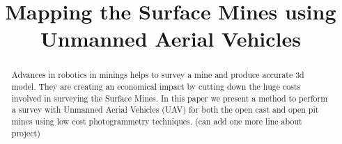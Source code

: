 \documentclass[conference]{IEEEtran}
\begin{document}
%
\title{Mapping the Surface Mines using Unmanned Aerial Vehicles}
\author{
\and
{}
}


\maketitle

\begin{abstract}
Advances in robotics in minings helps to survey a mine and produce accurate 3d model. They are creating an economical impact by cutting down the huge costs involved in surveying the Surface Mines. In this paper we present a method to perform a survey with Unmanned Aerial Vehicles (UAV) for both the open cast and open pit mines using low cost photogrammetry techniques.
(can add one more line about project)
\end{abstract}
\end{document}
